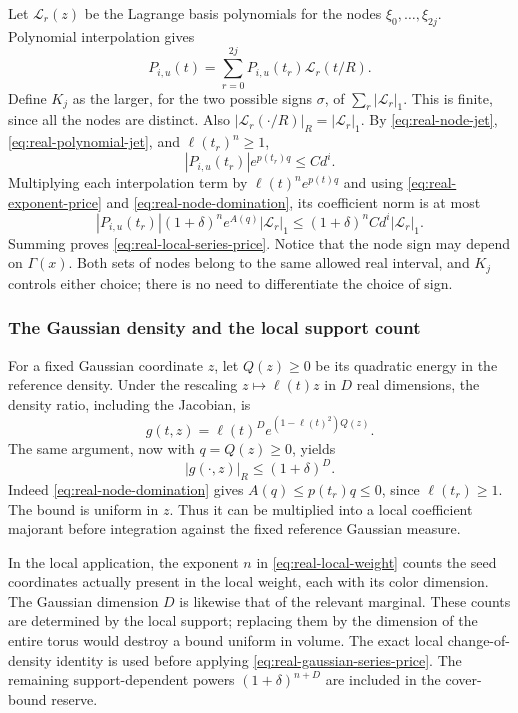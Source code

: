 Let $\mathcal L_r(z)$ be the Lagrange basis polynomials for the
nodes $\xi_0,\ldots,\xi_{2j}$. Polynomial interpolation gives
\[
          P_{i,u}(t)=\sum_{r=0}^{2j}P_{i,u}(t_r)
                                      \mathcal L_r(t/R).
\]
Define $K_j$ as the larger, for the two possible signs $\sigma$,
of $\sum_r|\mathcal L_r|_1$. This is finite, since all the nodes
are distinct. Also $|\mathcal L_r(\cdot/R)|_R
=|\mathcal L_r|_1$. By \eqref{eq:real-node-jet},
\eqref{eq:real-polynomial-jet}, and $\ell(t_r)^n\ge1$,
\[
        |P_{i,u}(t_r)|e^{p(t_r)q}\le C d^i.
\]
Multiplying each interpolation term by
$\ell(t)^n e^{p(t)q}$ and using
\eqref{eq:real-exponent-price} and
\eqref{eq:real-node-domination}, its coefficient norm is at most
\[
 |P_{i,u}(t_r)|(1+\delta)^n e^{A(q)}
                    |\mathcal L_r|_1
       \le (1+\delta)^n C d^i|\mathcal L_r|_1.
\]
Summing proves \eqref{eq:real-local-series-price}. Notice that the
node sign may depend on $\Gamma(x)$. Both sets of nodes belong to
the same allowed real interval, and $K_j$ controls either choice;
there is no need to differentiate the choice of sign.

\subsubsection{The Gaussian density and the local support count}
For a fixed Gaussian coordinate $z$, let $Q(z)\ge0$ be its quadratic
energy in the reference density. Under the rescaling
$z\mapsto\ell(t)z$ in $D$ real dimensions, the density ratio,
including the Jacobian, is
\[
                 g(t,z)=\ell(t)^D e^{(1-\ell(t)^2)Q(z)}.
\]
The same argument, now with $q=Q(z)\ge0$, yields
\begin{equation}\label{eq:real-gaussian-series-price}
                              |g(\cdot,z)|_R\le(1+\delta)^D.
\end{equation}
Indeed \eqref{eq:real-node-domination} gives
$A(q)\le p(t_r)q\le0$, since $\ell(t_r)\ge1$.
The bound is uniform in $z$. Thus it can be multiplied into a
local coefficient majorant before integration against the fixed
reference Gaussian measure.

In the local application, the exponent $n$ in
\eqref{eq:real-local-weight} counts the seed coordinates actually
present in the local weight, each with its color dimension. The
Gaussian dimension $D$ is likewise that of the relevant marginal.
These counts are determined by the local support; replacing them
by the dimension of the entire torus would destroy a bound uniform
in volume. The exact local change-of-density identity is used
before applying \eqref{eq:real-gaussian-series-price}. The remaining
support-dependent powers $(1+\delta)^{n+D}$ are included in the
cover-bound reserve.


